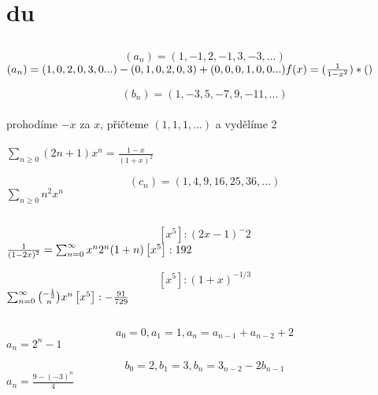 \documentclass[a4paper]{article}
\begin{document}
\pagestyle{fancy}

\section{du}
\subsection{}

$$
(a_n) = (1, -1, 2, -1, 3, -3, ...)
$$
$
(a_n) = (1, 0, 2, 0, 3, 0 ...) - (0, 1, 0, 2, 0, 3) + (0, 0, 0, 1, 0, 0 ...)\\
f(x) = 	(\frac{1}{1-x^2}) * ()	
$

$$
(b_n) = (1, -3, 5, -7, 9, -11, ...)
$$
\\
prohodíme $-x$ za $x$, přičteme $(1, 1, 1, ...)$ a vydělíme 2
\\ \\
$
\sum_{n \geq 0}(2n + 1)x^n = 
\frac{1-x}{(1+x)^2}
$


$$
(c_n) = (1, 4, 9, 16, 25, 36, ...)
$$
$
\sum_{n \geq 0} n^2 x^n 
$

\subsection{}
$$
[x^5] : (2x - 1)^-2
$$
$
\frac{1}{(1-2x)^2}=
\sum_{n=0}^\infty x^n 2^n (1+n)
\\ \\
\left[ x^5 \right] : 192
$

$$
[x^5] : (1 + x)^{-1/3}
$$
$
\sum_{n=0}^\infty \binom{-\frac{1}{3}}{n} x^n
\\ \\
\left[ x^5 \right] : -\frac{91}{729}
$


\subsection{}
$$
a_0 = 0, a_1 = 1, a_n = a_{n-1} + a_{n-2} + 2
$$
$
a_n = 2^n -1
$

$$
b_0 = 2, b_1 = 3, b_n = 3_{n-2} - 2b_{n-1}
$$
$
a_n = \frac{9-(-3)^n}{4}
$
\end{document}
